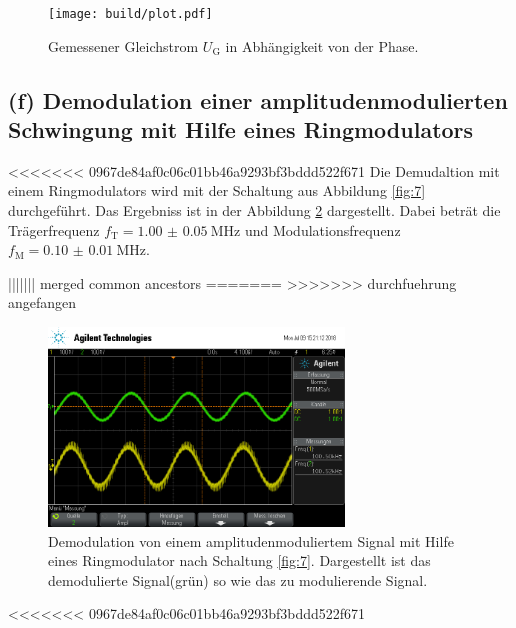 \begin{figure}
  \centering
  \texttt{[image: build/plot.pdf]}
  \caption{Gemessener Gleichstrom $U_{\text{G}}$ in Abhängigkeit von der Phase.}
  \label{fig:plot}
\end{figure}

\subsection{(f) Demodulation einer amplitudenmodulierten Schwingung
mit Hilfe eines Ringmodulators}
<<<<<<< 0967de84af0c06c01bb46a9293bf3bddd522f671
\label{subsubsec:auswertung_f}
Die Demudaltion mit einem Ringmodulators wird mit der Schaltung
aus Abbildung \ref{fig:7} durchgeführt. Das Ergebniss ist
in der Abbildung \ref{fig:amp_demod_ring} dargestellt.
Dabei beträt die Trägerfrequenz $f_{\text{T}}=\SI{1.00(5)}{\mega\hertz}$
und Modulationsfrequenz $f_{\text{M}}=\SI{0.10(1)}{\mega\hertz}$.

||||||| merged common ancestors
\label{subsubsec:auswertung_f}
=======
\label{subsec:auswertung_f}
>>>>>>> durchfuehrung angefangen

\begin{figure}
  \centering
  \includegraphics[width=0.7\textwidth]{osci/amp_demod.png}
  \caption{Demodulation von einem amplitudenmoduliertem Signal mit Hilfe eines
  Ringmodulator nach Schaltung \ref{fig:7}. Dargestellt ist das demodulierte Signal(grün) so wie das zu modulierende Signal.}
  \label{fig:amp_demod_ring}
\end{figure}




<<<<<<< 0967de84af0c06c01bb46a9293bf3bddd522f671

